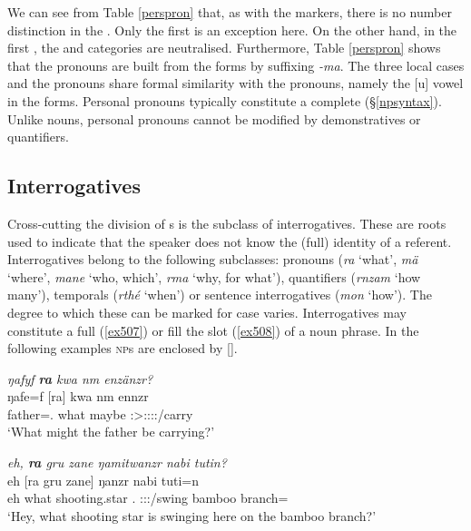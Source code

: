 We can see from Table \ref{perspron} that, as with the  markers, there is no number distinction in the . Only the first  is an exception here. On the other hand, in the first  , the  and  categories are neutralised. Furthermore, Table \ref{perspron} shows that the  pronouns are built from the  forms by suffixing \emph{-ma}. The three local cases and the  pronouns share formal similarity with the  pronouns, namely the [u] vowel in the  forms. Personal pronouns typically constitute a complete  (\S{}\ref{npsyntax}). Unlike nouns, personal pronouns cannot be modified by demonstratives or quantifiers.

\subsection{Interrogatives} \label{interrogatives}

Cross-cutting the division of s is the subclass of interrogatives. These are roots used to indicate that the speaker does not know the (full) identity of a referent. Interrogatives belong to the following  subclasses: pronouns (\emph{ra} `what', \emph{mä} `where', \emph{mane} `who, which', \emph{rma} `why, for what'), quantifiers (\emph{rnzam} `how many'), temporals (\emph{rthé} `when') or sentence interrogatives (\emph{mon} `how'). The degree to which these can be marked for case varies. Interrogatives may constitute a full  (\ref{ex507}) or fill the  slot (\ref{ex508}) of a noun phrase. In the following examples \textsc{np}s are enclosed by [].

\begin{exe}
	\ex \emph{ŋafyf \textbf{ra} kwa nm enzänzr?}\\
	\gll ŋafe=f [ra] kwa nm ennzr\\
	father=\Erg.\Sg{} what \Fut{} maybe \Stsg:\Sbj>\Stpl:\Obj:\Nonpast:\Ipfv:\Venit/carry\\
	\trans `What might the father be carrying?'
	\label{ex507}
\end{exe}
\begin{exe}
	\ex \emph{eh, \textbf{ra} gru zane ŋamitwanzr nabi tutin?}\\
	\gll eh [ra gru zane] ŋanzr nabi tuti=n\\
	eh what shooting.star \Dem.\Prox{} \Stsg:\Sbj:\Nonpast:\Ipfv/swing bamboo branch=\Loc{}\\
	\trans `Hey, what shooting star is swinging here on the bamboo branch?'\\
	\label{ex508}
\end{exe}%

